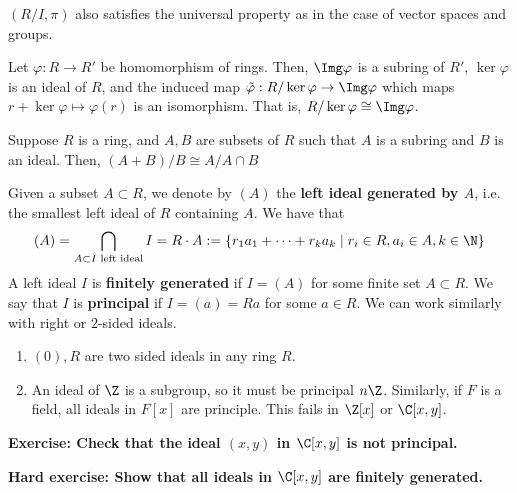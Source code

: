 \begin{thm}
    $(R/I,\pi)$ also satisfies the universal property as in the case of vector spaces and groups.
\end{thm}

\begin{thm}
    Let $\varphi:R \to R'$ be homomorphism of rings. Then, $\Img \varphi$ is a subring of $R'$, $\ker \varphi$ is an ideal of $R$, and the induced map $\tilde \varphi :R/\ker \varphi \to \Img \varphi$ which maps $r+\ker \varphi \mapsto \varphi (r)$ is an isomorphism. That is, $R/\ker \varphi \cong \Img \varphi$.
\end{thm}

\begin{thm}
    Suppose $R$ is a ring, and $A,B$ are subsets of $R$ such that $A$ is a subring and $B$ is an ideal. Then, $(A+B)/B \cong A/A \cap B$
\end{thm}

\begin{defn}
    Given a subset $A \subset R$, we denote by $(A)$ the \textbf{left ideal generated by $A$}, i.e. the smallest left ideal of $R$ containing $A$. We have that
    $$(A) = \bigcap _{A\subset I\text{ left ideal}}I=R\cdot A:=\{r_1a_1+\cdots+r_ka_k \mid r_i\in R,a_i \in A, k \in \N\}$$
    A left ideal $I$ is \textbf{finitely generated} if $I=(A)$ for some finite set $A\subset R$. We say that $I$ is \textbf{principal} if $I = (a)=Ra$ for some $a \in R$. We can work similarly with right or $2$-sided ideals.
\end{defn}

\begin{ex}
    \begin{enumerate}
        \item $(0),R$ are two sided ideals in any ring $R$.
        \item An ideal of $\Z$ is a subgroup, so it must be principal $n\Z$. Similarly, if $F$ is a field, all ideals in $F[x]$ are principle. This fails in $\Z[x]$ or $\C[x,y]$.
    \end{enumerate}
\end{ex}

\textbf{Exercise: Check that the ideal $(x,y)$ in $\C[x,y]$ is not principal.}

\textbf{Hard exercise: Show that all ideals in $\C[x,y]$ are finitely generated.}

